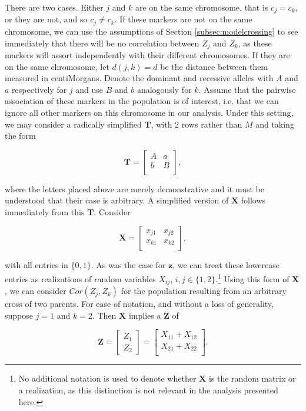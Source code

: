 \documentclass{article}
\newcommand{\ve}[1]{\mathbf{#1}}           %
\newcommand{\m}[1]{\mathbf{#1}}               %
\begin{document}
There are two cases. Either $j$ and $k$ are on the same chromosome, that is $c_j = c_k$, or they are not, and so $c_j \neq c_k$. If these markers are not on the same chromosome, we can use the assumptions of Section \ref{subsec:modelcrossing} to see immediately that there will be no correlation between $Z_j$ and $Z_k$, as these markers will assort independently with their different chromosomes. If they are on the same chromosome, let $d(j,k) = d$ be the distance between them measured in centiMorgans. Denote the dominant and recessive alleles with $A$ and $a$ respectively for $j$ and use $B$ and $b$ analogously for $k$. Assume that the pairwise association of these markers in the population is of interest, i.e. that we can ignore all other markers on this chromosome in our analysis. Under this setting, we may consider a radically simplified $\m{T}$, with 2 rows rather than $M$ and taking the form

$$\m{T} = \begin{bmatrix}
  A & a \\
  b & B \\
\end{bmatrix},$$

\noindent where the letters placed above are merely demonstrative and it must be understood that their case is arbitrary. A simplified version of $\m{X}$ follows immediately from this $\m{T}$. Consider

$$\m{X} = \begin{bmatrix}
  x_{j1} & x_{j2} \\
  x_{k1} & x_{k2} \\
\end{bmatrix},$$

\noindent with all entries in $\{0,1\}$. As was the case for $\ve{z}$, we can treat these lowercase entries as realizations of random variables $X_{ij}$, $i,j \in \{1,2\}$.\footnote{No additional notation is used to denote whether $\m{X}$ is the random matrix or a realization, as this distinction is not relevant in the analysis presented here.} Using this form of $\m{X}$, we can consider $Cor(Z_j, Z_k)$ for the population resulting from an arbitrary cross of two parents. For ease of notation, and without a loss of generality, suppose $j = 1$ and $k = 2$. Then $\m{X}$ implies a $\ve{Z}$ of

$$\ve{Z} = \begin{bmatrix} Z_1 \\ Z_2 \end{bmatrix} = \begin{bmatrix}
  X_{11} + X_{12} \\
  X_{21} + X_{22} \\
\end{bmatrix}.$$
\end{document}
